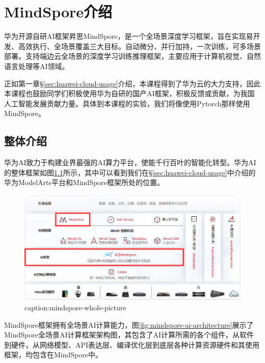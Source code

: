 \chapter{MindSpore介绍}

华为开源自研AI框架{昇}思MindSpore，是一个全场景深度学习框架，旨在实现易开发、高效执行、全场景覆盖三大目标。自动微分、并行加持，一次训练，可多场景部署。支持端边云全场景的深度学习训练推理框架，主要应用于计算机视觉、自然语言处理等AI领域。

正如第一章\S\ref{sec:huawei-cloud-usage}介绍，本课程得到了华为云的大力支持，因此本课程也鼓励同学们积极使用华为自研的国产AI框架，积极反馈或贡献，为我国人工智能发展贡献力量。具体到本课程的实验，我们将像使用Pytorch那样使用MindSpore。


\section{整体介绍}

华为AI致力于构建业界最强的AI算力平台，使能千行百叶的智能化转型。华为AI的整体框架如图\ref{fig:mindspore-whole-picture}所示，其中可以看到我们在\S\ref{sec:huawei-cloud-usage}中介绍的华为ModelArts平台和MindSpore框架所处的位置。
\begin{figure}[htbp]
	\centering
	\includegraphics[width=1\textwidth]{figures/mindspore-whole-picture.png}
	\caption{caption:mindspore-whole-picture}
	\label{fig:mindspore-whole-picture}
\end{figure}

MindSpore框架拥有全场景AI计算能力，图\ref{fig:mindspore-ai-architecture}展示了MindSpore全场景AI计算框架架构图，其包含了AI计算所需的各个组件，从软件到硬件，从网络模型、API表达层、编译优化层到底层各种计算资源硬件和其使用框架，均包含在MindSpore中。

